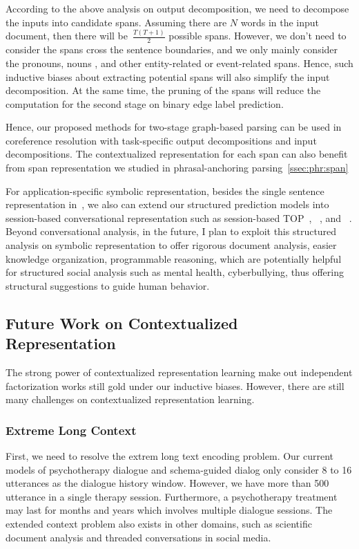 According to the above analysis on output decomposition, we need to
decompose the inputs into candidate spans. Assuming there are $N$
words in the input document, then there will be~$\frac{T(T+1)}{2}$
possible spans. However, we don't need to consider the spans cross the
sentence boundaries, and we only mainly consider the pronouns, nouns
, and other entity-related or event-related spans. Hence, such
inductive biases about extracting potential spans will also simplify
the input decomposition. At the same time, the pruning of the spans
will reduce the computation for the second stage on binary edge label
prediction.

Hence, our proposed methods for two-stage graph-based parsing can be
used in coreference resolution with task-specific output
decompositions and input decompositions. The contextualized
representation for each span can also benefit from span representation
we studied in phrasal-anchoring parsing~\autoref{ssec:phr:span}

For application-specific symbolic representation, besides the single
sentence representation
in~\cite[TOP,][]{gupta-etal-2018-semantic-parsing}, we also can extend
our structured prediction models into session-based conversational
representation such as session-based
TOP~\cite{aghajanyan2020conversational},
~\cite[TreeDST,][]{cheng2020conversational}, and
~\cite[Dataflow,][]{andreas2020task}.  Beyond conversational analysis,
in the future, I plan to exploit this structured analysis on symbolic
representation to offer rigorous document analysis, easier knowledge
organization, programmable reasoning, which are potentially helpful
for structured social analysis such as mental health, cyberbullying,
thus offering structural suggestions to guide human behavior.

\subsection{Future Work on Contextualized Representation}
\label{ssec:future:contextural-rep}
The strong power of
contextualized representation learning make out independent
factorization works still gold under our inductive biases. However,
there are still many challenges on contextualized representation
learning.

\subsubsection{Extreme Long Context}
\label{sssec:future:extrem-long-context}
First, we need to resolve the extrem long text encoding problem. Our
current models of psychotherapy dialogue and schema-guided dialog only
consider 8 to 16 utterances as the dialogue history window. However,
we have more than 500 utterance in a single therapy
session. Furthermore, a psychotherapy treatment may last for months
and years which involves multiple dialogue sessions. The extended
context problem also exists in other domains, such as scientific
document analysis and threaded conversations in social media.

